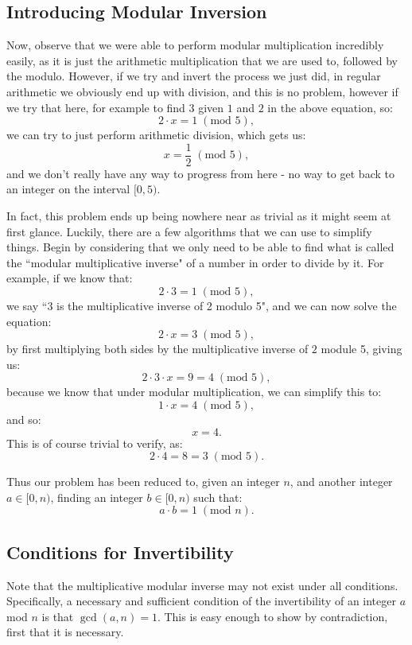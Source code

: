 \documentclass{article}
\begin{document}
\subsection{Introducing Modular Inversion}
Now, observe that we were able to perform modular multiplication incredibly easily, as it is just the arithmetic multiplication that we are used to, followed by the modulo. However, if we try and invert the process we just did, in regular arithmetic we obviously end up with division, and this is no problem, however if we try that here, for example to find $3$ given $1$ and $2$ in the above equation, so:
\[
    2 \cdot x = 1 \; (\text{mod } 5),
\]
we can try to just perform arithmetic division, which gets us:
\[
    x = \frac{1}{2} \; (\text{mod } 5),
\]
and we don't really have any way to progress from here - no way to get back to an integer on the interval $[0, 5)$. \medskip

\noindent In fact, this problem ends up being nowhere near as trivial as it might seem at first glance. Luckily, there are a few algorithms that we can use to simplify things. Begin by considering that we only need to be able to find what is called the ``modular multiplicative inverse" of a number in order to divide by it. For example, if we know that:
\[
    2 \cdot 3 = 1 \; (\text{mod } 5),
\]
we say ``3 is the multiplicative inverse of 2 modulo 5", and we can now solve the equation:
\[
    2 \cdot x = 3 \; (\text{mod } 5),
\]
by first multiplying both sides by the multiplicative inverse of $2$ module 5, giving us:
\[
    2 \cdot 3 \cdot x = 9 = 4 \; (\text{mod } 5),
\]
because we know that under modular multiplication, we can simplify this to:
\[
    1 \cdot x = 4 \; (\text{mod } 5),
\]
and so:
\[
    x = 4.
\]
This is of course trivial to verify, as:
\[
    2 \cdot 4 = 8 = 3 \; (\text{mod } 5).
\]

Thus our problem has been reduced to, given an integer $n$, and another integer $a \in [0, n)$, finding an integer $b \in [0, n)$ such that:
\[
    a \cdot b = 1 \; (\text{mod } n).
\]

\subsection{Conditions for Invertibility}
Note that the multiplicative modular inverse may not exist under all conditions. Specifically, a necessary and sufficient condition of the invertibility of an integer $a$ mod $n$ is that $\gcd(a, n) = 1$. This is easy enough to show by contradiction, first that it is necessary. \medskip
\end{document}
